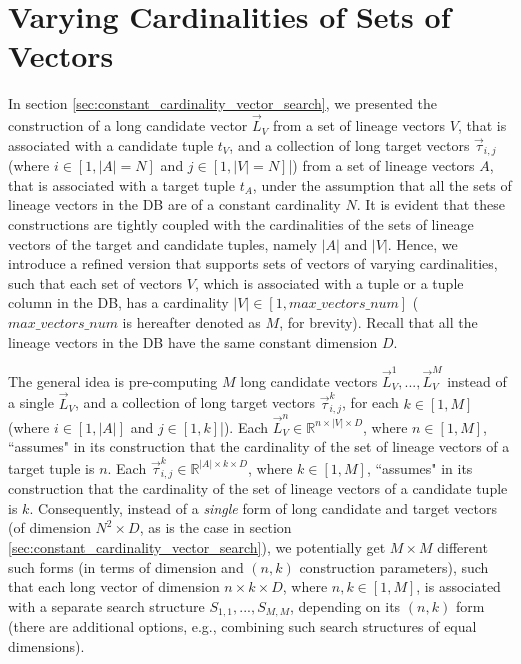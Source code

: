 \section{Varying Cardinalities of Sets of Vectors}\label{sec:varying_cardinalities_vector_search}
In section \ref{sec:constant_cardinality_vector_search}, we presented the construction of a long candidate vector $\vec{L}_V$ from a set of lineage vectors $V$, that is associated with a candidate tuple $t_V$, and a collection of long target vectors $\vec{\tau}_{i, j}$ (where $i \in [1, |A|=N]$ and $j \in [1, |V| = N]$|) from a set of lineage vectors $A$, that is associated with a target tuple $t_A$, under the assumption that all the sets of lineage vectors in the DB are of a constant cardinality $N$. It is evident that these constructions are tightly coupled with the cardinalities of the sets of lineage vectors of the target and candidate tuples, namely $|A|$ and $|V|$.
Hence, we introduce a refined version that supports sets of vectors of varying cardinalities, such that each set of vectors 
$V$, which is associated with a tuple or a tuple column in the DB, has a cardinality $|V| \in [1, max\_vectors\_num]$ ($max\_vectors\_num$ is hereafter denoted as $M$, for brevity). 
Recall that all the lineage vectors in the DB have the same constant dimension $D$.
\par The general idea is pre-computing $M$ long candidate vectors $\vec{L}_V^1, ..., \vec{L}_V^M$ instead of a single $\vec{L}_V$, and a collection of long target vectors $\vec{\tau}_{i, j}^k$, for each $k \in [1, M]$ (where $i \in [1, |A|]$ and $j \in [1, k]$|). Each $\vec{L}_V^n \in \mathbb{R}^{n \times |V| \times D}$, where $n \in [1, M]$, ``assumes" in its construction that the cardinality of the set of lineage vectors of a target tuple is $n$. Each $\vec{\tau}_{i, j}^k \in \mathbb{R}^{|A| \times k \times D}$, where $k \in [1, M]$, ``assumes" in its construction that the cardinality of the set of lineage vectors of a candidate tuple is $k$. Consequently, instead of a \textit{single} form of long candidate and target vectors (of dimension $N^2 \times D$, as is the case in section \ref{sec:constant_cardinality_vector_search}), we potentially get $M \times M$ different such forms (in terms of dimension and $(n, k)$ construction parameters), such that each long vector of dimension $n \times k \times D$, where $n,k \in [1, M]$, is associated with a separate search structure $S_{1,1}, ..., S_{M,M}$, depending on its $(n, k)$ form (there are additional options, e.g., combining such search structures of equal dimensions).

